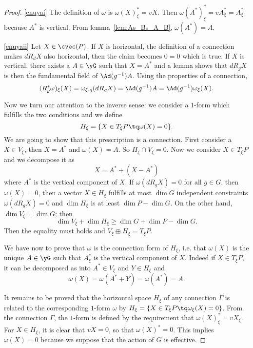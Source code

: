 \begin{proof}
	\ref{enuyai} The definition of $\omega$ is $\omega(X)^*_{\xi}=vX$. Then $\omega(A^*)^*_{\xi}=vA^*_{\xi}=A^*_{\xi}$ because $A^*$ is vertical. From lemma~\ref{lem:As_Bs_A_B}, $\omega(A^*)=A$.

	\ref{enuyaii} Let $X\in\cvec(P)$. If $X$ is horizontal, the definition of a connection makes $dR_d X$ also horizontal, then the claim becomes $0=0$ which is true. If $X$ is vertical, there exists a $A\in\yG$ such that $X=A^*$ and a lemma shows that $dR_gX$ is then the fundamental field of $\Ad(g^{-1})A$. Using the properties of a connection,
	\begin{equation}
		(R^*_g\omega)_{\xi}(X)=\omega_{\xi\cdot g}(dR_g X)=\Ad(g^{-1})A=\Ad(g^{-1})\omega_{\xi}(X).
	\end{equation}

	Now we turn our attention to the inverse sense: we consider a $1$-form which fulfills the two conditions and we define
	\begin{equation}
		H_{\xi}=\{X\in T_{\xi} P\tq \omega(X)=0\}.
	\end{equation}
	We are going to show that this prescription is a connection. First consider a $X\in V_{\xi}$, then $X=A^*$ and $\omega(X)=A$. So $H_{\xi}\cap V_{\xi}=0$. Now we consider $X\in T_{\xi} P$ and we decompose it as
	\[
		X=A^*+(X-A^*)
	\]
	where $A^*$ is the vertical component of $X$. If $\omega(dR_g X)=0$ for all $g\in G$, then $\omega(X)=0$, then a vector $X\in H_{\xi}$ fulfills at most $\dim G$ independent constraints $\omega(dR_g X)=0$ and $\dim H_{\xi}$ is at least $\dim P-\dim G$. On the other hand, $\dim V_{\xi}=\dim G$; then
	\[
		\dim V_{\xi}+\dim H_{\xi}\geq\dim G+\dim P-\dim G.
	\]
	Then the equality must holds and $V_{\xi}\oplus H_{\xi}=T_{\xi} P$.

	We have now to prove that $\omega$ is the connection form of $H_{\xi}$, i.e. that $\omega(X)$ is the unique $A\in\yG$ such that $A^*_{\xi}$ is the vertical component of $X$. Indeed if $X\in T_{\xi} P$, it can be decomposed as into $A^*\in V_{\xi}$ and $Y\in H_{\xi}$ and
	\[
		\omega(X)=\omega(A^*+Y)=\omega(A^*)=A.
	\]

	It remains to be proved that the horizontal space $H_{\xi}$ of any connection $\Gamma$ is related to the corresponding $1$-form $\omega$ by $H_{\xi}=\{X\in T_{\xi} P\tq\omega_{\xi}(X)=0\}$. From the connection $\Gamma$, the $1$-form is defined by the requirement that $\omega(X)^*_{\xi}=vX_{\xi}$. For $X\in H_{\xi}$, it is clear that $vX=0$, so that $\omega(X)^*=0$. This implies $\omega(X)=0$ because we suppose that the action of $G$ is effective.

\end{proof}


